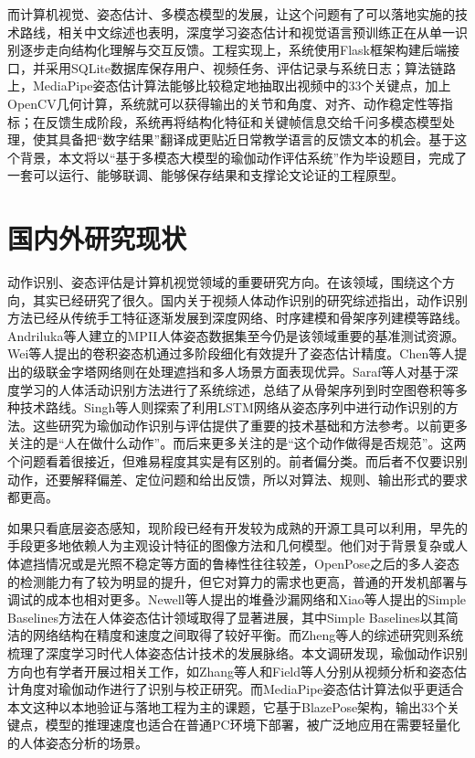 \documentclass[UTF8,twoside]{ctexrep}
\makeatletter
\def@NAT@last@yr{\@citea}%
\def@NAT@last@yr{-\NAT@penalty}%
\makeatother
\begin{document}
而计算机视觉、姿态估计、多模态模型的发展，让这个问题有了可以落地实施的技术路线，相关中文综述也表明，深度学习姿态估计和视觉语言预训练正在从单一识别逐步走向结构化理解与交互反馈\cite{ref_cn_pose_estimation_survey,ref_cn_visual_language_pretraining}。工程实现上，系统使用Flask框架\cite{ref_flask}构建后端接口，并采用SQLite数据库\cite{ref_sqlite}保存用户、视频任务、评估记录与系统日志；算法链路上，MediaPipe姿态估计算法\cite{ref_mediapipe}能够比较稳定地抽取出视频中的33个关键点，加上OpenCV\cite{ref_opencv}几何计算，系统就可以获得输出的关节和角度、对齐、动作稳定性等指标；在反馈生成阶段，系统再将结构化特征和关键帧信息交给千问多模态模型\cite{ref_qwen}处理，使其具备把“数字结果”翻译成更贴近日常教学语言的反馈文本的机会。基于这个背景，本文将以“基于多模态大模型的瑜伽动作评估系统”作为毕设题目，完成了一套可以运行、能够联调、能够保存结果和支撑论文论证的工程原型。

\section{国内外研究现状}
动作识别、姿态评估是计算机视觉领域的重要研究方向。在该领域，围绕这个方向，其实已经研究了很久。国内关于视频人体动作识别的研究综述指出，动作识别方法已经从传统手工特征逐渐发展到深度网络、时序建模和骨架序列建模等路线\cite{ref_cn_video_action_survey}。Andriluka等人\cite{ref_mpii}建立的MPII人体姿态数据集至今仍是该领域重要的基准测试资源。Wei等人\cite{ref_cpm}提出的卷积姿态机通过多阶段细化有效提升了姿态估计精度。Chen等人\cite{ref_cpn}提出的级联金字塔网络则在处理遮挡和多人场景方面表现优异。Saraf等人\cite{ref_har_survey}对基于深度学习的人体活动识别方法进行了系统综述，总结了从骨架序列到时空图卷积等多种技术路线。Singh等人\cite{ref_lstm_pose_action}则探索了利用LSTM网络从姿态序列中进行动作识别的方法。这些研究为瑜伽动作识别与评估提供了重要的技术基础和方法参考。以前更多关注的是“人在做什么动作”。而后来更多关注的是“这个动作做得是否规范”。这两个问题看着很接近，但难易程度其实是有区别的。前者偏分类。而后者不仅要识别动作，还要解释偏差、定位问题和给出反馈，所以对算法、规则、输出形式的要求都更高。

如果只看底层姿态感知，现阶段已经有开发较为成熟的开源工具可以利用，早先的手段更多地依赖人为主观设计特征的图像方法和几何模型。他们对于背景复杂或人体遮挡情况或是光照不稳定等方面的鲁棒性往往较差，OpenPose\cite{ref_openpose}之后的多人姿态的检测能力有了较为明显的提升，但它对算力的需求也更高，普通的开发机部署与调试的成本也相对更多。Newell等人\cite{ref_hourglass}提出的堆叠沙漏网络和Xiao等人\cite{ref_simple_baselines}提出的Simple Baselines方法在人体姿态估计领域取得了显著进展，其中Simple Baselines以其简洁的网络结构在精度和速度之间取得了较好平衡。而Zheng等人\cite{ref_pose_survey}的综述研究则系统梳理了深度学习时代人体姿态估计技术的发展脉络。本文调研发现，瑜伽动作识别方向也有学者开展过相关工作，如Zhang等人\cite{ref_yoga_recognition}和Field等人\cite{ref_yoga_pose_estimation}分别从视频分析和姿态估计角度对瑜伽动作进行了识别与校正研究。而MediaPipe姿态估计算法\cite{ref_mediapipe}似乎更适合本文这种以本地验证与落地工程为主的课题，它基于BlazePose架构，输出33个关键点，模型的推理速度也适合在普通PC环境下部署，被广泛地应用在需要轻量化的人体姿态分析的场景。
\end{document}
